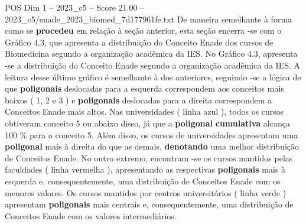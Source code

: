 \begin{textsample}{POS Dim 1 – 2023\_c5 – Score 21.00 – 2023\_c5/enade\_2023\_biomed\_7d177961fe.txt}
De maneira semelhante à forma como se \textbf{procedeu} em relação à seção anterior, esta seção encerra -se com o Gráfico 4.3, que apresenta a distribuição do Conceito Enade dos cursos de Biomedicina segundo a organização acadêmica da IES.
No Gráfico 4.3, apresenta -se a distribuição do Conceito Enade segundo a organização acadêmica da IES.
A leitura desse último gráfico é semelhante à dos anteriores, seguindo -se a lógica de que \textbf{poligonais} deslocadas para a esquerda correspondem aos conceitos mais baixos ( 1, 2 e 3 ) e \textbf{poligonais} deslocadas para a direita correspondem a Conceitos Enade mais altos.
Nas universidades ( linha azul ), todos os cursos obtiveram conceito 5 ou abaixo disso, já que a \textbf{poligonal} \textbf{cumulativa} alcança 100 \% para o conceito 5.
Além disso, os cursos de universidades apresentam uma \textbf{poligonal} mais à direita do que as demais, \textbf{denotando} uma melhor distribuição de Conceitos Enade.
No outro extremo, encontram -se os cursos mantidos pelas faculdades ( linha vermelha ), apresentando as respectivas \textbf{poligonais} mais à esquerda e, consequentemente, uma distribuição de Conceitos Enade com os menores valores.
Os cursos mantidos por centros universitários ( linha verde ) apresentam \textbf{poligonais} mais centrais e, consequentemente, uma distribuição de Conceitos Enade com os valores intermediários.

\end{textsample}
